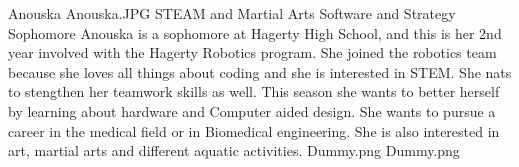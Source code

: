 \insertbio
{Anouska}
{Anouska.JPG}
{STEAM and Martial Arts}
{Software and Strategy}
{Sophomore}
{
Anouska is a sophomore at Hagerty High School, and this is her 2nd year involved with the Hagerty Robotics program. She joined the robotics team because she loves all things about coding and she is interested in STEM. She nats to stengthen her teamwork skills as well. This season she wants to better herself by learning about hardware and Computer aided design. She wants to pursue a career in the medical field or in Biomedical engineering. She is also interested in art, martial arts and different aquatic activities. 
}
{Dummy.png}
{Dummy.png}

